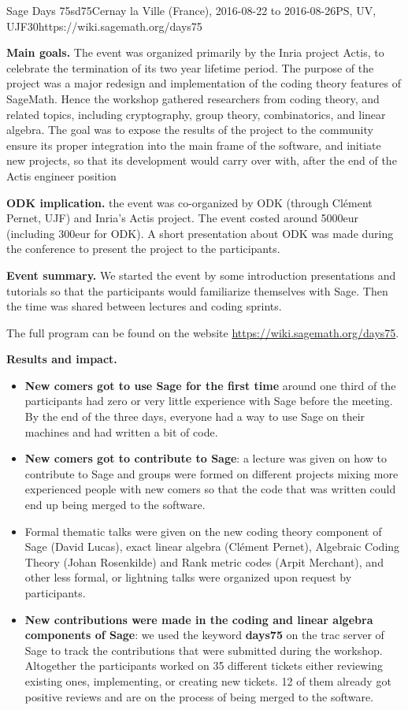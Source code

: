 \begin{event}{Sage Days 75}{sd75}{Cernay la Ville (France), 2016-08-22 to  2016-08-26}{PS, UV, UJF}{30}{https://wiki.sagemath.org/days75}

\textbf{Main goals.} The event was organized primarily by the Inria project
Actis, to celebrate the termination of its two year lifetime period. The purpose
of the project was a major redesign and implementation of the coding theory
features of SageMath. Hence the workshop gathered researchers from coding
theory, and related topics, including cryptography, group theory, combinatorics,
and linear algebra.
The goal was to expose the results of the project to the community ensure its
proper integration into the main frame of the software, and initiate new
projects, so that its development would carry over with, after the end of the
Actis engineer position

\textbf{ODK implication.} the event was co-organized by ODK (through Clément
Pernet, UJF) and Inria's Actis project. The event costed around 5000eur (including 300eur for ODK).
A short presentation about ODK was made during the conference to present the project to the participants.

\textbf{Event summary.} We started the event by some introduction presentations and tutorials so that
the participants would familiarize themselves with Sage. Then the time was shared between lectures
and coding sprints.

The full program can be found on the website \url{https://wiki.sagemath.org/days75}. 

\textbf{Results and impact.} 
\begin{itemize}
\item \textbf{New comers got to use Sage for the first time} around one
third of the participants had zero or very little experience with Sage before the meeting. By the
end of the three days, everyone had a way to use Sage on their machines and had written a bit of code.
\item \textbf{New comers got to contribute to Sage}: a lecture was given on how to contribute to Sage
and groups were formed on different projects mixing more experienced people with new comers so
that the code that was written could end up being merged to the software. 
\item Formal thematic talks were given on the new coding theory component of Sage (David
  Lucas), exact linear algebra (Clément Pernet), Algebraic Coding Theory (Johan Rosenkilde) and Rank metric codes (Arpit
  Merchant), and other less formal, or lightning talks were organized upon
  request by participants.
\item \textbf{New contributions were made in the coding and linear algebra components of Sage}: we used the keyword
\textbf{days75} on the trac server of Sage to track the contributions that were submitted during the workshop.
 Altogether the participants
worked on 35 different tickets either reviewing existing ones, implementing, or
creating new tickets. 12 of them already got positive reviews and are on the process of being merged to the software.
\end{itemize}




\end{event}
